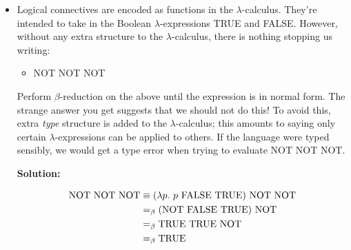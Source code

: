 \documentclass[11pt]{report}
\begin{document}
\begin{itemize}


	\item Logical connectives are encoded as functions in the $\lambda$-calculus. They're intended to take in the Boolean $\lambda$-expressions TRUE and FALSE. However, without any extra structure to the $\lambda$-calculus, there is nothing stopping us writing:

	\vspace{0.2cm}
	\begin{itemize}
		\item[] NOT NOT NOT 
	\end{itemize}

	\vspace{0.2cm}

	Perform $\beta$-reduction on the above until the expression is in normal form. The strange answer you get suggests that we should not do this! To avoid this, extra \emph{type} structure is added to the $\lambda$-calculus; this amounts to saying only certain $\lambda$-expressions can be applied to others. If the language were typed sensibly, we would get a type error when trying to evaluate NOT NOT NOT.

	{\bf Solution:}

	\begin{align*}
		\text{NOT} \ \text{NOT} \ \text{NOT} &\equiv (\lambda p. \ p \ \text{FALSE} \ \text{TRUE}) \ \text{NOT} \ \text{NOT} \\
		&=_{\beta} (\text{NOT} \ \text{FALSE} \ \text{TRUE}) \ \text{NOT} \\
		&=_{\beta} \text{TRUE} \ \text{TRUE} \ \text{NOT} \\
		&=_{\beta} \text{TRUE}
	\end{align*}
	
\end{itemize}	
\end{document}
